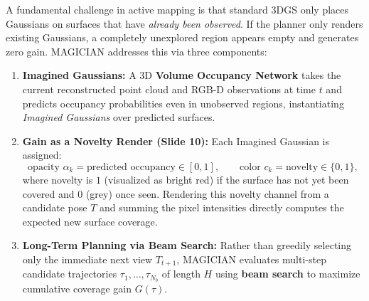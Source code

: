 \documentclass[11pt,a4paper]{article}
\theoremstyle{definition}
\theoremstyle{plain}
\theoremstyle{remark}
\begin{document}
A fundamental challenge in active mapping is that standard 3DGS only places Gaussians on surfaces that have \emph{already been observed}. If the planner only renders existing Gaussians, a completely unexplored region appears empty and generates zero gain. MAGICIAN addresses this via three components:
\begin{enumerate}[leftmargin=*]
    \item \textbf{Imagined Gaussians:} A 3D \textbf{Volume Occupancy Network} takes the current reconstructed point cloud and RGB-D observations at time $t$ and predicts occupancy probabilities even in unobserved regions, instantiating \emph{Imagined Gaussians} over predicted surfaces.
    \item \textbf{Gain as a Novelty Render (Slide 10):} Each Imagined Gaussian is assigned:
    \[
    \text{opacity } \alpha_k = \text{predicted occupancy} \in [0,1], \qquad \text{color } c_k = \text{novelty} \in \{0, 1\},
    \]
    where novelty is $1$ (visualized as bright red) if the surface has not yet been covered and $0$ (grey) once seen. Rendering this novelty channel from a candidate pose $T$ and summing the pixel intensities directly computes the expected new surface coverage.
    \item \textbf{Long-Term Planning via Beam Search:} Rather than greedily selecting only the immediate next view $T_{t+1}$, MAGICIAN evaluates multi-step candidate trajectories $\tau_1, \dots, \tau_{N_b}$ of length $H$ using \textbf{beam search} to maximize cumulative coverage gain $G(\tau)$.
\end{enumerate}
\end{document}
